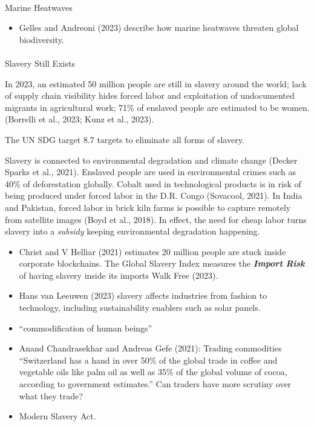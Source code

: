 \documentclass[
  letterpaper,
  DIV=11,
  numbers=noendperiod]{scrartcl}
\makeatletter
\let\oldparagraph\paragraph
\renewcommand{\paragraph}{
    \@ifstar
      \xxxParagraphStar
      \xxxParagraphNoStar
  }
\newcommand{\xxxParagraphStar}[1]{\oldparagraph*{#1}\mbox{}}
\newcommand{\xxxParagraphNoStar}[1]{\oldparagraph{#1}\mbox{}}
\providecommand{\tightlist}{%
  \setlength{\itemsep}{0pt}\setlength{\parskip}{0pt}}\usepackage{longtable,booktabs,array}
\makeatother
\begin{document}
\paragraph{Marine Heatwaves}\label{marine-heatwaves}

\begin{itemize}
\tightlist
\item
  Gelles and Andreoni (2023) describe how marine heatwaves threaten
  global biodiversity.
\end{itemize}

\paragraph{Slavery Still Exists}\label{slavery-still-exists}

In 2023, an estimated 50 million people are still in slavery around the
world; lack of supply chain visibility hides forced labor and
exploitation of undocumented migrants in agricultural work; 71\% of
enslaved people are estimated to be women. (Borrelli et al., 2023; Kunz
et al., 2023).

The UN SDG target 8.7 targets to eliminate all forms of slavery.

Slavery is connected to environmental degradation and climate change
(Decker Sparks et al., 2021). Enslaved people are used in environmental
crimes such as 40\% of deforestation globally. Cobalt used in
technological products is in risk of being produced under forced labor
in the D.R. Congo (Sovacool, 2021). In India and Pakistan, forced labor
in brick kiln farms is possible to capture remotely from satellite
images (Boyd et al., 2018). In effect, the need for cheap labor turns
slavery into a \emph{subsidy} keeping environmental degradation
happening.

\begin{itemize}
\item
  Christ and V Helliar (2021) estimates 20 million people are stuck
  inside corporate blockchains. The Global Slavery Index measures the
  \textbf{\emph{Import Risk}} of having slavery inside its imports Walk
  Free (2023).
\item
  Hans van Leeuwen (2023) slavery affects industries from fashion to
  technology, including sustainability enablers such as solar panels.
\item
  ``commodification of human beings''
\item
  Anand Chandrasekhar and Andreas Gefe (2021): Trading commodities
  ``Switzerland has a hand in over 50\% of the global trade in coffee
  and vegetable oils like palm oil as well as 35\% of the global volume
  of cocoa, according to government estimates.'' Can traders have more
  scrutiny over what they trade?
\item
  Modern Slavery Act.
\end{itemize}
\end{document}
